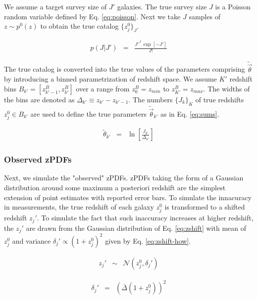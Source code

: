 \documentclass[preprint]{aastex}
\begin{document}
We assume a target survey size of $J'$ galaxies.  The true survey size $J$ is a 
Poisson random variable defined by Eq. \ref{eq:poisson}.  Next we take $J$ 
samples of $z\sim p^{0}(z)$ to obtain the true catalog $\{z_{j}^{0}\}_{J}$.  

\begin{eqnarray}
\label{eq:poisson}
p(J|J') &=& \frac{J'^{J}\ \exp[-J']}{J!}
\end{eqnarray}

The true catalog is converted into the true values of the parameters comprising 
$\tilde{\vec{\theta}}$ by introducing a binned parametrization of redshift 
space.  We assume $K'$ redshift bins $B_{k'}=[z^{B}_{k'-1},z^{B}_{k'}]$ over a 
range from $z^{B}_{0}=z_{min}$ to $z^{B}_{K'}=z_{max}$.  The widths of the bins 
are denoted as $\Delta_{k'}\equiv z_{k'}-z_{k'-1}$.  The numbers 
$\{J_{k}\}_{K}$ of true redshifts $z^{0}_{j}\in B_{k'}$ are used to define the 
true parameters $\tilde{\vec{\theta}}_{k'}$ as in Eq. \ref{eq:sums}.

\begin{eqnarray}
\label{eq:sums}
\tilde{\theta}_{k'} &=& \ln\left[\frac{J_{k'}}{\Delta_{k'}}\right]
\end{eqnarray}

\clearpage
\subsubsection{Observed zPDFs}
\label{sec:d}

Next, we simulate the "observed" zPDFs.  zPDFs taking the form of a Gaussian 
distribution around some maximum a posteriori redshift are the simplest 
extension of point estimates with reported error bars.  To simulate the 
innacuracy in measurements, the true redshift of each galaxy $z_{j}^{0}$ is 
transformed to a shifted redshift $z_{j}'$.  To simulate the fact that such 
inaccuracy increases at higher redshift, the $z_{j}'$ are drawn from the 
Gaussian distribution of Eq. \ref{eq:zshift} with mean of $z_{j}^{0}$ and 
variance $\delta_{j}'\propto(1+z_{j}^{0})^{2}$ given by Eq. 
\ref{eq:zshift-how}.  

\begin{eqnarray}
\label{eq:zshift}
z_{j}' &\sim& \mathcal{N}(z_{j}^{0},\delta_{j}')
\end{eqnarray}

\begin{eqnarray}
\label{eq:zshift-how}
\delta_{j}' &=& (\bar{\Delta}(1+z^{0}_{j}))^{2}
\end{eqnarray}
\end{document}
